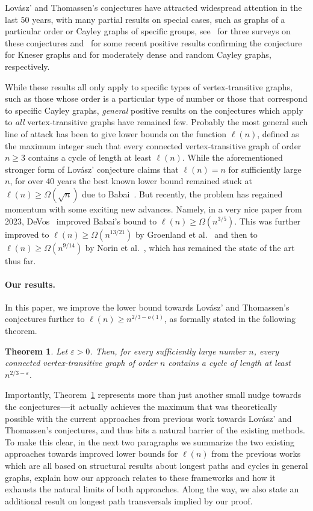 \documentclass[11pt,reqno]{article}
\newtheorem{theorem}{Theorem}[section]
\begin{document}
Lov\'{a}sz' and Thomassen's conjectures have attracted widespread attention in the last $50$ years, with many partial results on special cases, such as graphs of a particular order or Cayley graphs of specific groups, see~\cite{alspach81,kutnar,cayley-survey-84} for three surveys on these conjectures and~\cite{torsten,bedert,draganic,bradac} for some recent positive results confirming the conjecture for Kneser graphs and for moderately dense and random Cayley graphs, respectively. 

While these results all only apply to specific types of vertex-transitive graphs, such as those whose order is a particular type of number or those that correspond to specific Cayley graphs, \emph{general} positive results on the conjectures which apply to \emph{all} vertex-transitive graphs have remained few. Probably the most general such line of attack has been to give lower bounds on the function $\ell(n)$, defined as the maximum integer such that every connected vertex-transitive graph of order $n\ge 3$ contains a cycle of length at least $\ell(n)$. While the aforementioned stronger form of Lov\'{a}sz' conjecture claims that $\ell(n)=n$ for sufficiently large $n$, for over 40 years the best known lower bound remained stuck at $\ell(n)\ge\Omega(\sqrt{n})$ due to Babai~\cite{babai}. But recently, the problem has regained momentum with some exciting new advances. Namely, in a very nice paper from 2023, DeVos~\cite{devos} improved Babai's bound to $\ell(n)\ge \Omega(n^{3/5})$. This was further improved to $\ell(n)\ge \Omega(n^{13/21})$ by Groenland et al.~\cite{groen} and then to $\ell(n)\ge \Omega(n^{9/14})$ by Norin et al.~\cite{norin}, which has remained the state of the art thus far.
\paragraph{\textbf{Our results.}} In this paper, we improve the lower bound towards Lov\'{a}sz' and Thomassen's conjectures further to $\ell(n)\ge n^{2/3-o(1)}$, as formally stated in the following theorem.

\begin{theorem}\label{thm:mainlovasz}
Let $\varepsilon>0$. Then, for every sufficiently large number $n$, every connected vertex-transitive graph of order $n$ contains a cycle of length at least $n^{2/3-\varepsilon}$.
\end{theorem}

Importantly, Theorem~\ref{thm:mainlovasz} represents more than just another small nudge towards the conjectures\textbf{---}it actually achieves the maximum that was theoretically possible with the current approaches from previous work towards Lov\'{a}sz' and Thomassen's conjectures, and thus hits a natural barrier of the existing methods. To make this clear, in the next two paragraphs we summarize the two existing approaches towards improved lower bounds for $\ell(n)$ from the previous works~\cite{devos,groen,ma2025intersections,norin} which are all based on structural results about longest paths and cycles in general graphs, explain how our approach relates to these frameworks and how it exhausts the natural limits of both approaches. Along the way, we also state an additional result on longest path transversals implied by our proof.
\end{document}
